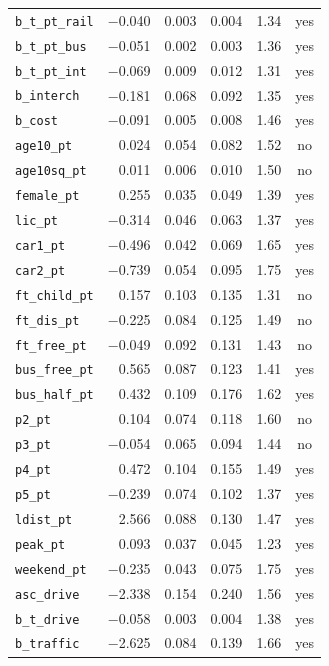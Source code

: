 \begin{longtable}{lrrrrc}
\texttt{b\_t\_pt\_rail} & $-$0.040 & 0.003 & 0.004 & 1.34 & yes \\
\texttt{b\_t\_pt\_bus} & $-$0.051 & 0.002 & 0.003 & 1.36 & yes \\
\texttt{b\_t\_pt\_int} & $-$0.069 & 0.009 & 0.012 & 1.31 & yes \\
\texttt{b\_interch} & $-$0.181 & 0.068 & 0.092 & 1.35 & yes \\
\texttt{b\_cost} & $-$0.091 & 0.005 & 0.008 & 1.46 & yes \\
\texttt{age10\_pt} & 0.024 & 0.054 & 0.082 & 1.52 & no \\
\texttt{age10sq\_pt} & 0.011 & 0.006 & 0.010 & 1.50 & no \\
\texttt{female\_pt} & 0.255 & 0.035 & 0.049 & 1.39 & yes \\
\texttt{lic\_pt} & $-$0.314 & 0.046 & 0.063 & 1.37 & yes \\
\texttt{car1\_pt} & $-$0.496 & 0.042 & 0.069 & 1.65 & yes \\
\texttt{car2\_pt} & $-$0.739 & 0.054 & 0.095 & 1.75 & yes \\
\texttt{ft\_child\_pt} & 0.157 & 0.103 & 0.135 & 1.31 & no \\
\texttt{ft\_dis\_pt} & $-$0.225 & 0.084 & 0.125 & 1.49 & no \\
\texttt{ft\_free\_pt} & $-$0.049 & 0.092 & 0.131 & 1.43 & no \\
\texttt{bus\_free\_pt} & 0.565 & 0.087 & 0.123 & 1.41 & yes \\
\texttt{bus\_half\_pt} & 0.432 & 0.109 & 0.176 & 1.62 & yes \\
\texttt{p2\_pt} & 0.104 & 0.074 & 0.118 & 1.60 & no \\
\texttt{p3\_pt} & $-$0.054 & 0.065 & 0.094 & 1.44 & no \\
\texttt{p4\_pt} & 0.472 & 0.104 & 0.155 & 1.49 & yes \\
\texttt{p5\_pt} & $-$0.239 & 0.074 & 0.102 & 1.37 & yes \\
\texttt{ldist\_pt} & 2.566 & 0.088 & 0.130 & 1.47 & yes \\
\texttt{peak\_pt} & 0.093 & 0.037 & 0.045 & 1.23 & yes \\
\texttt{weekend\_pt} & $-$0.235 & 0.043 & 0.075 & 1.75 & yes \\
\texttt{asc\_drive} & $-$2.338 & 0.154 & 0.240 & 1.56 & yes \\
\texttt{b\_t\_drive} & $-$0.058 & 0.003 & 0.004 & 1.38 & yes \\
\texttt{b\_traffic} & $-$2.625 & 0.084 & 0.139 & 1.66 & yes \\

\end{longtable}
